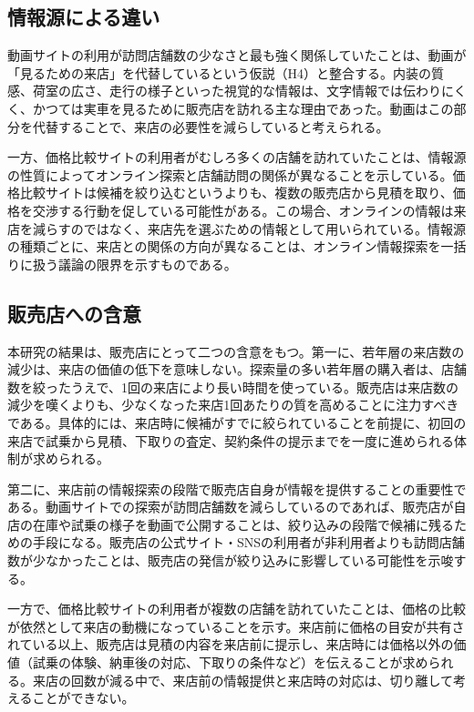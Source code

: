 \subsection{情報源による違い}

動画サイトの利用が訪問店舗数の少なさと最も強く関係していたことは、動画が「見るための来店」を代替しているという仮説（H4）と整合する。内装の質感、荷室の広さ、走行の様子といった視覚的な情報は、文字情報では伝わりにくく、かつては実車を見るために販売店を訪れる主な理由であった。動画はこの部分を代替することで、来店の必要性を減らしていると考えられる。

一方、価格比較サイトの利用者がむしろ多くの店舗を訪れていたことは、情報源の性質によってオンライン探索と店舗訪問の関係が異なることを示している。価格比較サイトは候補を絞り込むというよりも、複数の販売店から見積を取り、価格を交渉する行動を促している可能性がある。この場合、オンラインの情報は来店を減らすのではなく、来店先を選ぶための情報として用いられている。情報源の種類ごとに、来店との関係の方向が異なることは、オンライン情報探索を一括りに扱う議論の限界を示すものである。

\subsection{販売店への含意}

本研究の結果は、販売店にとって二つの含意をもつ。第一に、若年層の来店数の減少は、来店の価値の低下を意味しない。探索量の多い若年層の購入者は、店舗数を絞ったうえで、1回の来店により長い時間を使っている。販売店は来店数の減少を嘆くよりも、少なくなった来店1回あたりの質を高めることに注力すべきである。具体的には、来店時に候補がすでに絞られていることを前提に、初回の来店で試乗から見積、下取りの査定、契約条件の提示までを一度に進められる体制が求められる。

第二に、来店前の情報探索の段階で販売店自身が情報を提供することの重要性である。動画サイトでの探索が訪問店舗数を減らしているのであれば、販売店が自店の在庫や試乗の様子を動画で公開することは、絞り込みの段階で候補に残るための手段になる。販売店の公式サイト・SNSの利用者が非利用者よりも訪問店舗数が少なかったことは、販売店の発信が絞り込みに影響している可能性を示唆する。

一方で、価格比較サイトの利用者が複数の店舗を訪れていたことは、価格の比較が依然として来店の動機になっていることを示す。来店前に価格の目安が共有されている以上、販売店は見積の内容を来店前に提示し、来店時には価格以外の価値（試乗の体験、納車後の対応、下取りの条件など）を伝えることが求められる。来店の回数が減る中で、来店前の情報提供と来店時の対応は、切り離して考えることができない。

